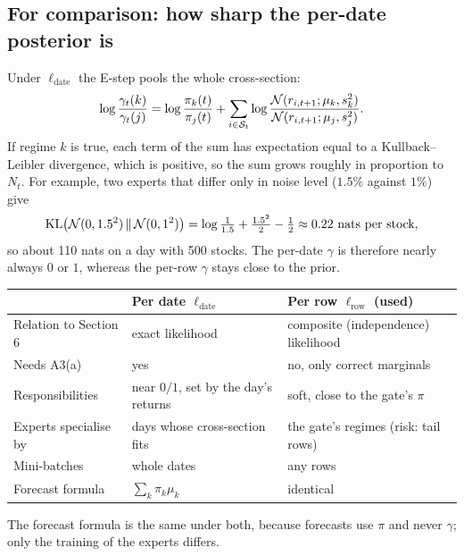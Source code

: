 \subsection{For comparison: how sharp the per-date posterior is}
Under $\ell_{\text{date}}$ the E-step pools the whole cross-section:
\begin{equation}
\log\frac{\gamma_t(k)}{\gamma_t(j)}=\log\frac{\pi_k(t)}{\pi_j(t)}+\sum_{i\in\mathcal S_t}\log\frac{\mathcal{N}(r_{i,t+1};\mu_k,s_k^2)}{\mathcal{N}(r_{i,t+1};\mu_j,s_j^2)}.
\end{equation}
If regime $k$ is true, each term of the sum has expectation equal to a Kullback--Leibler divergence, which is positive, so the sum grows roughly in proportion to $N_t$. For example, two experts that differ only in noise level ($1.5\%$ against $1\%$) give
\begin{equation}
\mathrm{KL}\big(\mathcal{N}(0,1.5^2)\,\|\,\mathcal{N}(0,1^2)\big)=\log\tfrac{1}{1.5}+\tfrac{1.5^2}{2}-\tfrac12\approx0.22\text{ nats per stock},
\end{equation}
so about 110 nats on a day with 500 stocks. The per-date $\gamma$ is therefore nearly always $0$ or $1$, whereas the per-row $\gamma$ stays close to the prior.

\begin{center}
\renewcommand{\arraystretch}{1.25}
\begin{tabularx}{\textwidth}{@{}lXX@{}}
\toprule
 & Per date $\ell_{\text{date}}$ & Per row $\ell_{\text{row}}$ (\textbf{used}) \\
\midrule
Relation to Section 6 & exact likelihood & composite (independence) likelihood \\
Needs A3(a) & yes & no, only correct marginals \\
Responsibilities & near $0/1$, set by the day's returns & soft, close to the gate's $\pi$ \\
Experts specialise by & days whose cross-section fits & the gate's regimes (risk: tail rows) \\
Mini-batches & whole dates & any rows \\
Forecast formula & $\sum_k\pi_k\mu_k$ & identical \\
\bottomrule
\end{tabularx}
\end{center}
The forecast formula is the same under both, because forecasts use $\pi$ and never $\gamma$; only the training of the experts differs.


